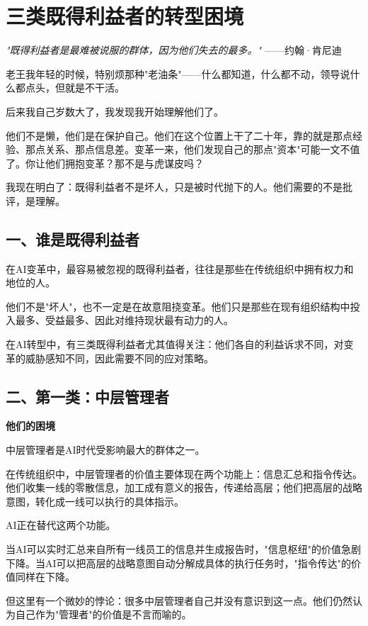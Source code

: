 \chapter{三类既得利益者的转型困境}


\textit{"既得利益者是最难被说服的群体，因为他们失去的最多。"}
——约翰·肯尼迪


老王我年轻的时候，特别烦那种"老油条"——什么都知道，什么都不动，领导说什么都点头，但就是不干活。

后来我自己岁数大了，我发现我开始理解他们了。

他们不是懒，他们是在保护自己。他们在这个位置上干了二十年，靠的就是那点经验、那点关系、那点信息差。变革一来，他们发现自己的那点"资本"可能一文不值了。你让他们拥抱变革？那不是与虎谋皮吗？

我现在明白了：既得利益者不是坏人，只是被时代抛下的人。他们需要的不是批评，是理解。

\section{一、谁是既得利益者}


在AI变革中，最容易被忽视的既得利益者，往往是那些在传统组织中拥有权力和地位的人。

他们不是"坏人"，也不一定是在故意阻挠变革。他们只是那些在现有组织结构中投入最多、受益最多、因此对维持现状最有动力的人。

在AI转型中，有三类既得利益者尤其值得关注：他们各自的利益诉求不同，对变革的威胁感知不同，因此需要不同的应对策略。

\section{二、第一类：中层管理者}


\textbf{他们的困境}

中层管理者是AI时代受影响最大的群体之一。

在传统组织中，中层管理者的价值主要体现在两个功能上：信息汇总和指令传达。他们收集一线的零散信息，加工成有意义的报告，传递给高层；他们把高层的战略意图，转化成一线可以执行的具体指示。

AI正在替代这两个功能。

当AI可以实时汇总来自所有一线员工的信息并生成报告时，"信息枢纽"的价值急剧下降。当AI可以把高层的战略意图自动分解成具体的执行任务时，"指令传达"的价值同样在下降。

但这里有一个微妙的悖论：很多中层管理者自己并没有意识到这一点。他们仍然认为自己作为"管理者"的价值是不言而喻的。

